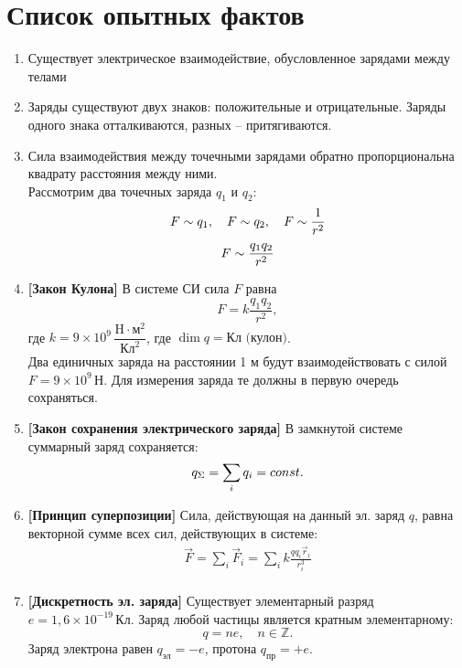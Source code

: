 \section{Список опытных фактов}

\begin{enumerate}
	\item Существует электрическое взаимодействие, обусловленное зарядами между телами
	\item Заряды существуют двух знаков: положительные и отрицательные. Заряды одного знака отталкиваются, разных -- притягиваются.
	\item Сила взаимодействия между точечными зарядами обратно пропорциональна квадрату расстояния между ними. \\
			Рассмотрим два точечных заряда $q_1$ и $q_2$:
				$$F \sim q_1, \quad F \sim q_2, \quad F \sim \frac{1}{r^2}$$
				$$F \sim \frac{q_1q_2}{r^2}$$
	\item \textbf{[Закон Кулона]} В системе СИ сила $F$ равна
				$$F=k\frac{q_1q_2}{r^2},$$
			где $k=9 \times 10^9 \,\dfrac{\text{H}\cdot \text{м}^2}{\text{Кл}^2}$, где $\dim{q}=\text{Кл (кулон)}$. \\
			Два единичных заряда на расстоянии 1 м будут взаимодействовать с силой $F=9\times 10^9 \, \text{Н}$. Для измерения заряда те должны в первую очередь сохраняться.
	\item \textbf{[Закон сохранения электрического заряда]} В замкнутой системе суммарный заряд сохраняется:
				$$q_{\Sigma}=\sum_i q_i=const.$$
	\item \textbf{[Принцип суперпозиции]} Сила, действующая на данный эл. заряд $q$, равна векторной сумме всех сил, действующих в системе:
			\begin{eqnarray*}\label{1}
				\vec{F} = \sum_i \vec{F}_i = \sum_i k\frac{qq_i\vec{r}_i}{r_i^3} \\
			\end{eqnarray*} 
	\item \textbf{[Дискретность эл. заряда]} Существует элементарный разряд $e=1,6 \times 10^{-19} \, \text{Кл}$. Заряд любой частицы является кратным элементарному:
				$$q=ne, \quad n \in \mathbb{Z}.$$
				Заряд электрона равен $q_{\text{эл}}=-e$, протона $q_{\text{пр}}=+e$.

\end{enumerate}